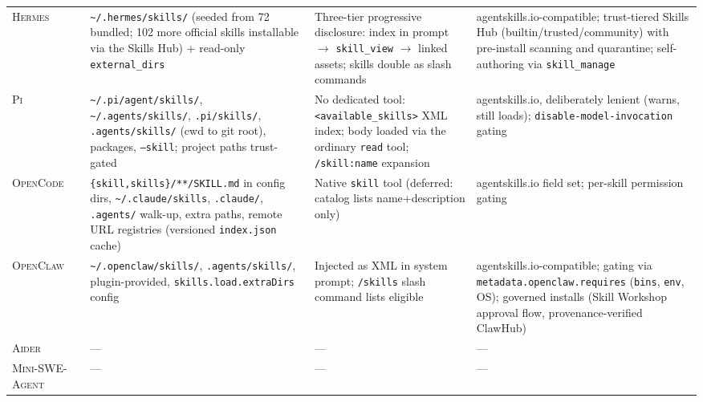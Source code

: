 \documentclass[11pt,a4paper]{article}
\newcommand{\adr}{\textsc{Aider}\xspace}
\newcommand{\mswe}{\textsc{Mini-SWE-Agent}\xspace}
\newcommand{\ocl}{\textsc{OpenClaw}\xspace}
\newcommand{\hrm}{\textsc{Hermes}\xspace}
\newcommand{\pib}{\textsc{Pi}\xspace}
\newcommand{\ocd}{\textsc{OpenCode}\xspace}
\newcommand{\cmark}{\ding{51}}
\newcommand{\xmark}{\ding{55}}
\begin{document}
\begin{table}[H]
\begin{tabularx}{\textwidth}{@{}l c L{4.2cm} L{3.0cm} L{4.2cm}@{}}
\hrm{}    & \cmark & \texttt{\textasciitilde/.hermes/skills/} (seeded from 72 bundled; 102 more official skills installable via the Skills Hub) + read-only \texttt{external\_dirs} & Three-tier progressive disclosure: index in prompt $\to$ \texttt{skill\_view} $\to$ linked assets; skills double as slash commands & agentskills.io-compatible; trust-tiered Skills Hub (builtin/trusted/community) with pre-install scanning and quarantine; self-authoring via \texttt{skill\_manage} \\
\pib{}    & \cmark & \texttt{\textasciitilde/.pi/agent/skills/}, \texttt{\textasciitilde/.agents/skills/}, \texttt{.pi/skills/}, \texttt{.agents/skills/} (cwd to git root), packages, \texttt{--skill}; project paths trust-gated & No dedicated tool: \texttt{<available\_skills>} XML index; body loaded via the ordinary \texttt{read} tool; \texttt{/skill:name} expansion & agentskills.io, deliberately lenient (warns, still loads); \texttt{disable-model-invocation} gating \\
\ocd{}    & \cmark & \texttt{\{skill,skills\}/**/SKILL.md} in config dirs, \texttt{\textasciitilde/.claude/skills}, \texttt{.claude/}, \texttt{.agents/} walk-up, extra paths, remote URL registries (versioned \texttt{index.json} cache) & Native \texttt{skill} tool (deferred: catalog lists name+description only) & agentskills.io field set; per-skill permission gating \\
\ocl{}    & \cmark & \texttt{\textasciitilde/.openclaw/skills/}, \texttt{.agents/skills/}, plugin-provided, \texttt{skills.load.extraDirs} config & Injected as XML in system prompt; \texttt{/skills} slash command lists eligible & agentskills.io-compatible; gating via \texttt{metadata.openclaw.requires} (\texttt{bins}, \texttt{env}, OS); governed installs (Skill Workshop approval flow, provenance-verified ClawHub) \\
\adr{}    & \xmark & ---  & --- & --- \\
\mswe{}   & \xmark & ---  & --- & --- \\
\bottomrule
\end{tabularx}
\end{table}
\end{document}
